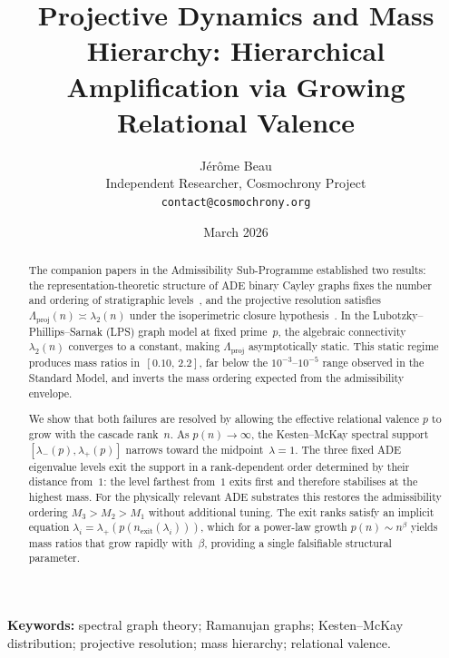 \documentclass[11pt,a4paper]{article}
\newcommand{\Lproj}{\Lambda_{\mathrm{proj}}}
\newcommand{\nexit}{n_{\mathrm{exit}}}
\newcommand{\ltwo}{\lambda_{2}}
\begin{document}
  \title{Projective Dynamics and Mass Hierarchy: Hierarchical Amplification via Growing Relational Valence}
  \author{J\'er\^ome Beau\\[4pt]
  \small Independent Researcher, Cosmochrony Project\\
  \small \texttt{contact@cosmochrony.org}
  }
  \date{March 2026}
  \maketitle


  \begin{abstract}
    The companion papers in the Admissibility Sub-Programme established two results:
    the representation-theoretic structure of ADE binary Cayley graphs fixes the number
    and ordering of stratigraphic levels~\cite{Beau2026a4}, and the projective resolution
    satisfies $\Lproj(n) \asymp \ltwo(n)$ under the isoperimetric closure
    hypothesis~\cite{Beau2026a5}.
    In the Lubotzky--Phillips--Sarnak (LPS) graph model at fixed prime~$p$,
    the algebraic connectivity $\ltwo(n)$ converges to a constant,
    making $\Lproj$ asymptotically static.
    This static regime produces mass ratios in~$[0.10,\,2.2]$,
    far below the $10^{-3}$--$10^{-5}$ range observed in the Standard Model,
    and inverts the mass ordering expected from the admissibility envelope.

    We show that both failures are resolved by allowing the effective
    relational valence $p$ to grow with the cascade rank~$n$.
    As $p(n)\to\infty$, the Kesten--McKay spectral support
    $[\lambda_{-}(p),\lambda_{+}(p)]$ narrows toward the midpoint~$\lambda=1$.
    The three fixed ADE eigenvalue levels exit the support in a rank-dependent
    order determined by their distance from~$1$: the level farthest from~$1$
    exits first and therefore stabilises at the highest mass.
    For the physically relevant ADE substrates this restores the admissibility ordering
    $M_{3}>M_{2}>M_{1}$ without additional tuning.
    The exit ranks satisfy an implicit equation
    $\lambda_{i} = \lambda_{+}(p(\nexit(\lambda_{i})))$,
    which for a power-law growth $p(n)\sim n^{\beta}$ yields
    mass ratios that grow rapidly with~$\beta$,
    providing a single falsifiable structural parameter.
  \end{abstract}

  \medskip
  \noindent\textbf{Keywords:}
  spectral graph theory; Ramanujan graphs; Kesten--McKay distribution;
  projective resolution; mass hierarchy; relational valence.
\end{document}
